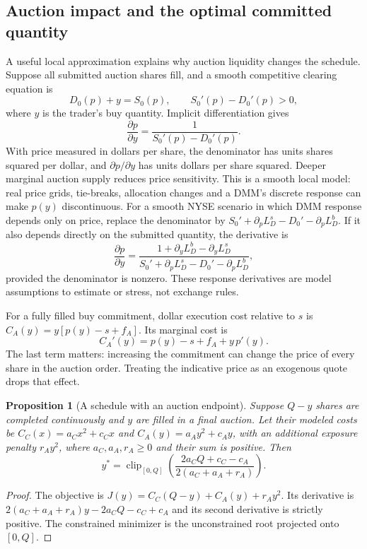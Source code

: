 \documentclass[11pt]{article}
\numberwithin{equation}{section}
\newtheorem{proposition}[theorem]{Proposition}
\theoremstyle{definition}
\theoremstyle{remark}
\theoremstyle{definition}
\newcommand{\clip}{\operatorname{clip}}
\begin{document}
\subsection{Auction impact and the optimal committed quantity}

A useful local approximation explains why auction liquidity changes the
schedule. Suppose all submitted auction shares fill, and a smooth competitive
clearing equation is
\begin{equation}\label{eq:auctionlocal}
 D_0(p)+y=S_0(p),\qquad S_0'(p)-D_0'(p)>0,
\end{equation}
where $y$ is the trader's buy quantity. Implicit differentiation gives
\begin{equation}\label{eq:auctionimpact}
 \frac{\partial p}{\partial y}
 =\frac{1}{S_0'(p)-D_0'(p)}.
\end{equation}
With price measured in dollars per share, the denominator has units shares
squared per dollar, and $\partial p/\partial y$ has units dollars per share
squared. Deeper marginal auction supply reduces price sensitivity. This is a
smooth local model: real price grids, tie-breaks, allocation changes and a DMM's
discrete response can make $p(y)$ discontinuous. For a smooth NYSE scenario in which DMM response depends only on price,
replace the denominator by $S_0'+\partial_pL_D^s-D_0'-\partial_pL_D^b$.
If it also depends directly on the submitted quantity, the derivative is
\[
 \frac{\partial p}{\partial y}=
 \frac{1+\partial_yL_D^b-\partial_yL_D^s}
 {S_0'+\partial_pL_D^s-D_0'-\partial_pL_D^b},
\]
provided the denominator is nonzero. These response derivatives are model
assumptions to estimate or stress, not exchange rules.

For a fully filled buy commitment, dollar execution cost relative to $s$ is
$C_A(y)=y[p(y)-s+f_A]$. Its marginal cost is
\begin{equation}\label{eq:auctionmarginalimpact}
 C_A'(y)=p(y)-s+f_A+y\,p'(y).
\end{equation}
The last term matters: increasing the commitment can change the price of every
share in the auction order. Treating the indicative price as an exogenous
quote drops that effect.

\begin{proposition}[A schedule with an auction endpoint]\label{prop:auctionendpoint}
Suppose $Q-y$ shares are completed continuously and $y$ are filled in a final
auction. Let their modeled costs be
$C_C(x)=a_Cx^2+c_Cx$ and $C_A(y)=a_Ay^2+c_Ay$, with an additional exposure
penalty $r_Ay^2$, where $a_C,a_A,r_A\geq0$ and their sum is positive. Then
\begin{equation}\label{eq:auctionquantity}
 y^*=\clip_{[0,Q]}
 \left(\frac{2a_CQ+c_C-c_A}{2(a_C+a_A+r_A)}\right).
\end{equation}
\end{proposition}
\begin{proof}
The objective is $J(y)=C_C(Q-y)+C_A(y)+r_Ay^2$. Its derivative is
$2(a_C+a_A+r_A)y-2a_CQ-c_C+c_A$ and its second derivative is strictly positive.
The constrained minimizer is the unconstrained root projected onto $[0,Q]$.
\end{proof}
\end{document}
